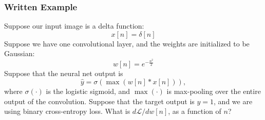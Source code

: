 \documentclass{beamer}
\begin{document}
\begin{frame}
  \frametitle{Written Example}
  Suppose our input image is a delta function:
  \begin{displaymath}
    x[n] = \delta[n]
  \end{displaymath}
  Suppose we have one convolutional layer, and the weights are
  initialized to be Gaussian:
  \begin{displaymath}
    w[n] = e^{-\frac{n^2}{2}}
  \end{displaymath}
  Suppose that the neural net output is
  \begin{displaymath}
    \hat{y}=\sigma\left(\max\left(w[n]\ast x[n]\right)\right),
  \end{displaymath}
  where $\sigma(\cdot)$ is the logistic sigmoid, and $\max(\cdot)$ is
  max-pooling over the entire output of the convolution.  Suppose that
  the target output is $y=1$, and we are using binary cross-entropy
  loss.  What is $d{\mathcal L}/dw[n]$, as a function of $n$?
\end{frame}
\end{document}
